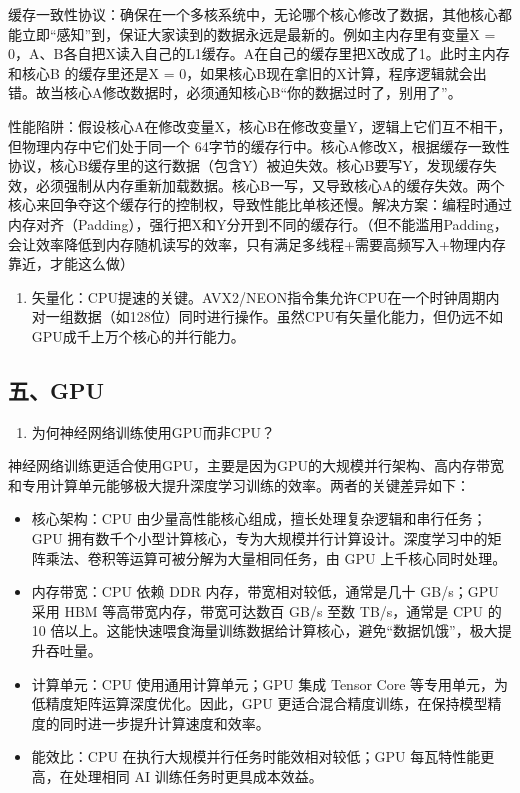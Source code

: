 缓存一致性协议：确保在一个多核系统中，无论哪个核心修改了数据，其他核心都能立即``感知''到，保证大家读到的数据永远是最新的。例如主内存里有变量X = 0，A、B各自把X读入自己的L1缓存。A在自己的缓存里把X改成了1。此时主内存和核心B 的缓存里还是X = 0，如果核心B现在拿旧的X计算，程序逻辑就会出错。故当核心A修改数据时，必须通知核心B``你的数据过时了，别用了''。

性能陷阱：假设核心A在修改变量X，核心B在修改变量Y，逻辑上它们互不相干，但物理内存中它们处于同一个 64字节的缓存行中。核心A修改X，根据缓存一致性协议，核心B缓存里的这行数据（包含Y）被迫失效。核心B要写Y，发现缓存失效，必须强制从内存重新加载数据。核心B一写，又导致核心A的缓存失效。两个核心来回争夺这个缓存行的控制权，导致性能比单核还慢。解决方案：编程时通过内存对齐（Padding），强行把X和Y分开到不同的缓存行。（但不能滥用Padding，会让效率降低到内存随机读写的效率，只有满足多线程+需要高频写入+物理内存靠近，才能这么做）

\begin{enumerate}
\def\labelenumi{\arabic{enumi}.}
\setcounter{enumi}{1}
\tightlist
\item
  矢量化：CPU提速的关键。AVX2/NEON指令集允许CPU在一个时钟周期内对一组数据（如128位）同时进行操作。虽然CPU有矢量化能力，但仍远不如GPU成千上万个核心的并行能力。
\end{enumerate}

\hypertarget{ux4e94gpu}{%
\subsection{五、GPU}\label{ux4e94gpu}}

\begin{enumerate}
\def\labelenumi{\arabic{enumi}.}
\tightlist
\item
  为何神经网络训练使用GPU而非CPU？
\end{enumerate}

神经网络训练更适合使用GPU，主要是因为GPU的大规模并行架构、高内存带宽和专用计算单元能够极大提升深度学习训练的效率。两者的关键差异如下：

\begin{itemize}
\tightlist
\item
  核心架构：CPU 由少量高性能核心组成，擅长处理复杂逻辑和串行任务；GPU 拥有数千个小型计算核心，专为大规模并行计算设计。深度学习中的矩阵乘法、卷积等运算可被分解为大量相同任务，由 GPU 上千核心同时处理。
\item
  内存带宽：CPU 依赖 DDR 内存，带宽相对较低，通常是几十 GB/s；GPU 采用 HBM 等高带宽内存，带宽可达数百 GB/s 至数 TB/s，通常是 CPU 的 10 倍以上。这能快速喂食海量训练数据给计算核心，避免``数据饥饿''，极大提升吞吐量。
\item
  计算单元：CPU 使用通用计算单元；GPU 集成 Tensor Core 等专用单元，为低精度矩阵运算深度优化。因此，GPU 更适合混合精度训练，在保持模型精度的同时进一步提升计算速度和效率。
\item
  能效比：CPU 在执行大规模并行任务时能效相对较低；GPU 每瓦特性能更高，在处理相同 AI 训练任务时更具成本效益。
\end{itemize}

